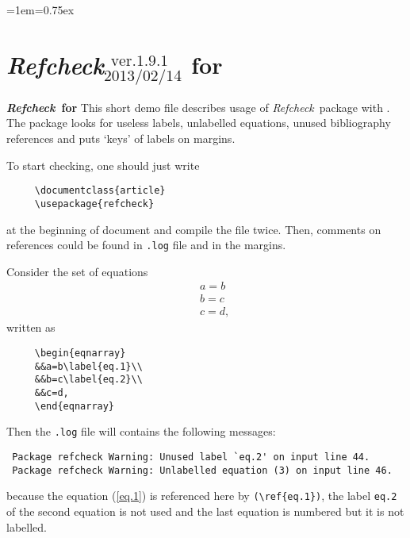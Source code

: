 \documentclass[11pt]{article}
\begin{document}
\baselineskip=4.5mm
\baselineskip
\pagestyle{myheadings}

\parindent=1em\parskip=0.75ex
\makeatletter

\thispagestyle{empty}

\enlargethispage{-8mm}

\def\RefCheck{\textsl{Refcheck\/}}
\def\AmS{\mbox{$\mathcal{A}$\kern-0.17em\raise-2.1pt\hbox{$\mathcal{M}$}%
\kern-0.115em$\mathcal{S}$}}
\renewcommand{\refname}{{\normalsize References}}
\def\curversion{1.9.1}
\def\curvertime{2013/02/14}

\section*{\RefCheck{\tiny${}^{\mathrm{\ \ ver.
\curversion}}_{\mathrm{\curvertime}}$} for \LaTeXe}
\markboth{\hfill\bfseries\RefCheck\ for \LaTeXe\hfill}%
{\hfill\bfseries\RefCheck\ for \LaTeXe\hfill}
This short demo file describes usage of \RefCheck\ package
with \LaTeXe. The package looks for useless labels,
unlabelled equations, unused bibliography references
and puts `keys' of labels on margins.

To start checking, one should just write
\begin{verbatim}
     \documentclass{article}
     \usepackage{refcheck}
\end{verbatim}
at the beginning of document and compile the file twice.
Then, comments on references could be found in \texttt{.log} file and
in the margins.

Consider the set of equations
\begin{eqnarray}
&&a=b\label{eq.1}\\
&&b=c\label{eq.2}\\
&&c=d,
\end{eqnarray}
written as
\begin{verbatim}
     \begin{eqnarray}
     &&a=b\label{eq.1}\\
     &&b=c\label{eq.2}\\
     &&c=d,
     \end{eqnarray}
\end{verbatim}
Then the \texttt{.log} file will contains the following messages:
{\small
\begin{verbatim}
 Package refcheck Warning: Unused label `eq.2' on input line 44.
 Package refcheck Warning: Unlabelled equation (3) on input line 46.
\end{verbatim}
}
\noindent
because the equation (\ref{eq.1}) is
referenced here by \verb#(\ref{eq.1})#, the label {\tt eq.2} of the second
equation is not used and the last equation is numbered but it is not
labelled.
\end{document}
